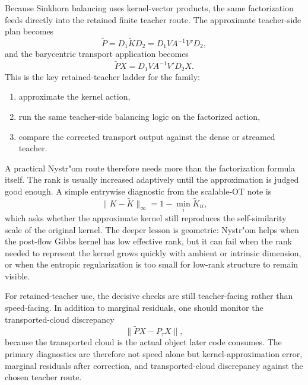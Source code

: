 Because Sinkhorn balancing uses kernel-vector products, the same factorization
feeds directly into the retained finite teacher route.  The approximate teacher-side
plan becomes
\begin{equation}
\label{eq:bf-learned-ot-nystrom-plan}
  \widetilde P
  =
  D_1\widetilde K D_2
  =
  D_1 V A^{-1}V' D_2,
\end{equation}
and the barycentric transport application becomes
\begin{equation}
\label{eq:bf-learned-ot-nystrom-transport}
  \widetilde P X
  =
  D_1 V A^{-1}V' D_2 X.
\end{equation}
This is the key retained-teacher ladder for the family:
\begin{enumerate}[label=(\roman*)]
  \item approximate the kernel action,
  \item run the same teacher-side balancing logic on the factorized action,
  \item compare the corrected transport output against the dense or streamed teacher.
\end{enumerate}
A practical Nystr"om route therefore needs more than the factorization formula
itself.  The rank is usually increased adaptively until the approximation is judged
good enough.  A simple entrywise diagnostic from the scalable-OT note is
\begin{equation}
\label{eq:bf-learned-ot-nystrom-diag-error}
  \|K-\widetilde K\|_\infty
  =
  1-\min_i \widetilde K_{ii},
\end{equation}
which asks whether the approximate kernel still reproduces the self-similarity
scale of the original kernel.  The deeper lesson is geometric: Nystr"om helps when
the post-flow Gibbs kernel has low effective rank, but it can fail when the rank
needed to represent the kernel grows quickly with ambient or intrinsic dimension,
or when the entropic regularization is too small for low-rank structure to remain
visible.

For retained-teacher use, the decisive checks are still teacher-facing rather than
speed-facing.  In addition to marginal residuals, one should monitor the
transported-cloud discrepancy
\begin{equation}
\label{eq:bf-learned-ot-nystrom-cloud-discrepancy}
  \|\widetilde P X-P_\tau X\|,
\end{equation}
because the transported cloud is the actual object later code consumes.  The
primary diagnostics are therefore not speed alone but kernel-approximation error,
marginal residuals after correction, and transported-cloud discrepancy against the
chosen teacher route.

